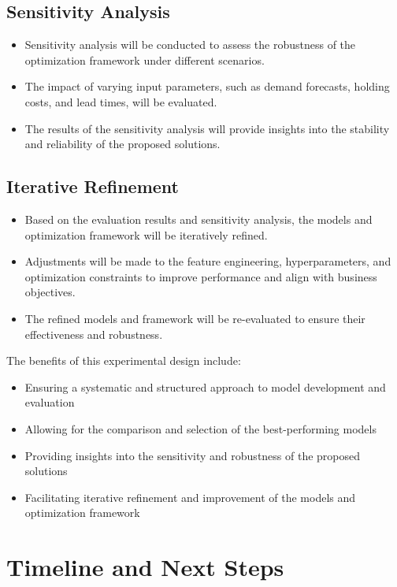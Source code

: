 \documentclass{article}
\begin{document}
\subsection{Sensitivity Analysis}
\begin{itemize}
  \item Sensitivity analysis will be conducted to assess the robustness of the optimization framework under different scenarios.
  \item The impact of varying input parameters, such as demand forecasts, holding costs, and lead times, will be evaluated.
  \item The results of the sensitivity analysis will provide insights into the stability and reliability of the proposed solutions.
\end{itemize}

\subsection{Iterative Refinement}
\begin{itemize}
  \item Based on the evaluation results and sensitivity analysis, the models and optimization framework will be iteratively refined.
  \item Adjustments will be made to the feature engineering, hyperparameters, and optimization constraints to improve performance and align with business objectives.
  \item The refined models and framework will be re-evaluated to ensure their effectiveness and robustness.
\end{itemize}

The benefits of this experimental design include:
\begin{itemize}
  \item Ensuring a systematic and structured approach to model development and evaluation
  \item Allowing for the comparison and selection of the best-performing models
  \item Providing insights into the sensitivity and robustness of the proposed solutions
  \item Facilitating iterative refinement and improvement of the models and optimization framework
\end{itemize}

\section{Timeline and Next Steps}
\end{document}
